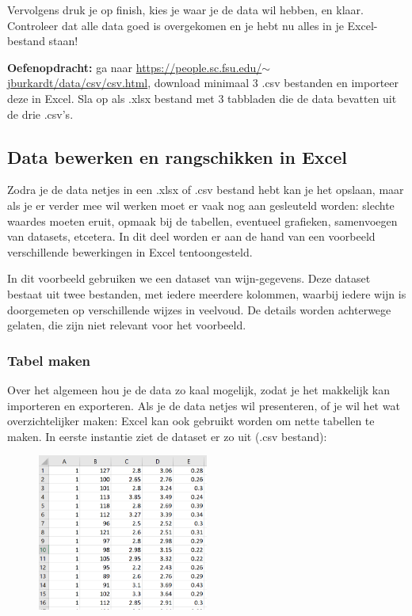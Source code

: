 Vervolgens druk je op finish, kies je waar je de data wil hebben, en klaar. Controleer dat alle data goed is overgekomen en je hebt nu alles in je Excel-bestand staan!

\color{saxion}\textbf{Oefenopdracht: }\color{black} ga naar \href{https://people.sc.fsu.edu/~jburkardt/data/csv/csv.html}{\textsf{https://people.sc.fsu.edu/$\sim$jburkardt/data/csv/csv.html}}, download minimaal 3 .csv bestanden en importeer deze in Excel. Sla op als .xlsx bestand met 3 tabbladen die de data bevatten uit de drie .csv's.

\subsection{Data bewerken en rangschikken in Excel}
Zodra je de data netjes in een .xlsx of .csv bestand hebt kan je het opslaan, maar als je er verder mee wil werken moet er vaak nog aan gesleuteld worden: slechte waardes moeten eruit, opmaak bij de tabellen, eventueel grafieken, samenvoegen van datasets, etcetera. In dit deel worden er aan de hand van een voorbeeld verschillende bewerkingen in Excel tentoongesteld.

In dit voorbeeld gebruiken we een dataset van wijn-gegevens. Deze dataset bestaat uit twee bestanden, met iedere meerdere kolommen, waarbij iedere wijn is doorgemeten op verschillende wijzes in veelvoud. De details worden achterwege gelaten, die zijn niet relevant voor het voorbeeld. 

\subsubsection*{Tabel maken}
Over het algemeen hou je de data zo kaal mogelijk, zodat je het makkelijk kan importeren en exporteren. Als je de data netjes wil presenteren, of je wil het wat overzichtelijker maken: Excel kan ook gebruikt worden om nette tabellen te maken.
In eerste instantie ziet de dataset er zo uit (.csv bestand):

\begin{figure}[h]
\begin{center}
\includegraphics[width=0.5\textwidth]{img/wijn1.png}
\end{center}
\end{figure}

